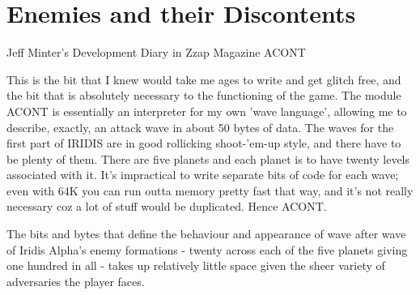 \chapter{Enemies and their Discontents} 
\label{sec:level}

\lstset{style=6502Style}

\begin{q}{Jeff Minter's Development Diary in Zzap Magazine\cite{devdiary}}
ACONT 

This is the bit that I knew would take me ages to write and get glitch
free, and the bit that is absolutely necessary to the functioning of the game.
The module ACONT is essentially an interpreter for my own 'wave language',
allowing me to describe, exactly, an attack wave in about 50 bytes of data. The
waves for the first part of IRIDIS are in good rollicking shoot-'em-up style,
and there have to be plenty of them. There are five planets and each planet is
to have twenty levels associated with it. It's impractical to write separate
bits of code for each wave; even with 64K you can run outta memory pretty fast
that way, and it's not really necessary coz a lot of stuff would be duplicated.
Hence ACONT.

\end{q}

The bits and bytes that define the behaviour and appearance of
wave after wave of Iridis Alpha's enemy formations - twenty across each of the
five planets giving one hundred in all - takes up relatively little space given
the sheer variety of adversaries the player faces.


